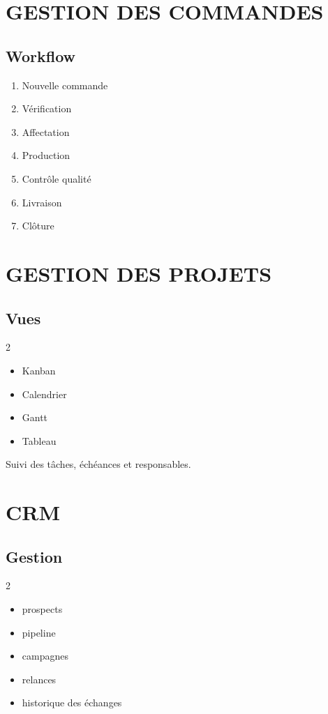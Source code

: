 \documentclass[12pt,a4paper,oneside]{book}
\begin{document}
\chapter{GESTION DES COMMANDES}

\section{Workflow}
\begin{enumerate}
\item Nouvelle commande
\item Vérification
\item Affectation
\item Production
\item Contrôle qualité
\item Livraison
\item Clôture
\end{enumerate}

\chapter{GESTION DES PROJETS}

\section{Vues}
\begin{multicols}{2}
\begin{itemize}
\item Kanban
\item Calendrier
\item Gantt
\item Tableau
\end{itemize}
\end{multicols}

Suivi des tâches, échéances et responsables.

\chapter{CRM}

\section{Gestion}
\begin{multicols}{2}
\begin{itemize}
\item prospects
\item pipeline
\item campagnes
\item relances
\item historique des échanges
\end{itemize}
\end{multicols}
\end{document}
